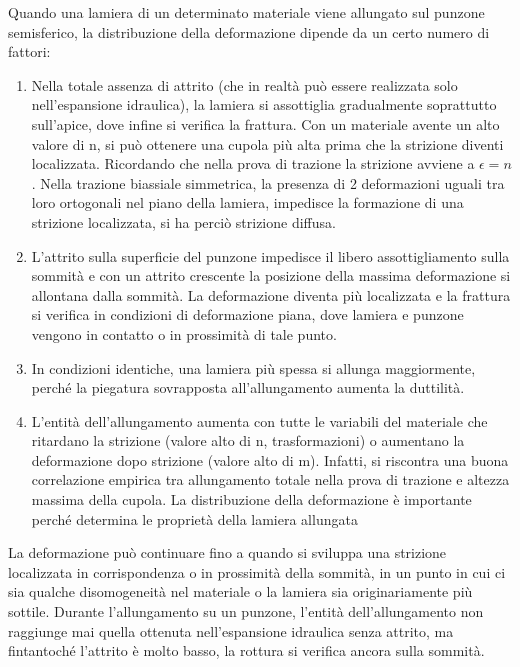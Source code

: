 Quando una lamiera di un determinato materiale viene allungato sul punzone semisferico, la distribuzione della deformazione dipende da un certo numero di fattori:
\begin{enumerate}
\item Nella totale assenza di attrito (che in realtà può essere realizzata solo nell'espansione idraulica), la lamiera si assottiglia gradualmente soprattutto sull'apice, dove infine si verifica la frattura.
Con un materiale avente un alto valore di n, si può ottenere una cupola più alta prima che la strizione diventi localizzata. Ricordando che nella prova di trazione la strizione avviene a $\epsilon = n$. Nella trazione biassiale simmetrica, la presenza di 2 deformazioni uguali tra loro ortogonali nel piano della lamiera, impedisce la formazione di una strizione localizzata, si ha perciò strizione diffusa.
\item L'attrito sulla superficie del punzone impedisce il libero assottigliamento sulla sommità e con un attrito crescente la posizione della massima deformazione si allontana dalla sommità. La deformazione diventa più localizzata e la frattura si verifica in condizioni di deformazione piana, dove lamiera e punzone vengono in contatto o in prossimità di tale punto.
\item In condizioni identiche, una lamiera più spessa si allunga maggiormente, perché la piegatura sovrapposta all'allungamento aumenta la duttilità.
\item L'entità dell'allungamento aumenta con tutte le variabili del materiale che ritardano la strizione (valore alto di n, trasformazioni) o aumentano la deformazione dopo strizione (valore alto di m). Infatti, si riscontra una buona correlazione empirica tra allungamento totale nella prova di trazione e altezza massima della cupola.
La distribuzione della deformazione è importante perché determina le proprietà della lamiera allungata
\end{enumerate}

La deformazione può continuare fino a quando si sviluppa una strizione localizzata in corrispondenza o in prossimità della sommità, in un punto in cui ci sia qualche disomogeneità nel materiale o la lamiera sia originariamente più sottile. Durante l'allungamento su un punzone, l'entità dell'allungamento non raggiunge mai quella ottenuta nell'espansione idraulica senza attrito, ma fintantoché l'attrito è molto basso, la rottura si verifica ancora sulla sommità.


